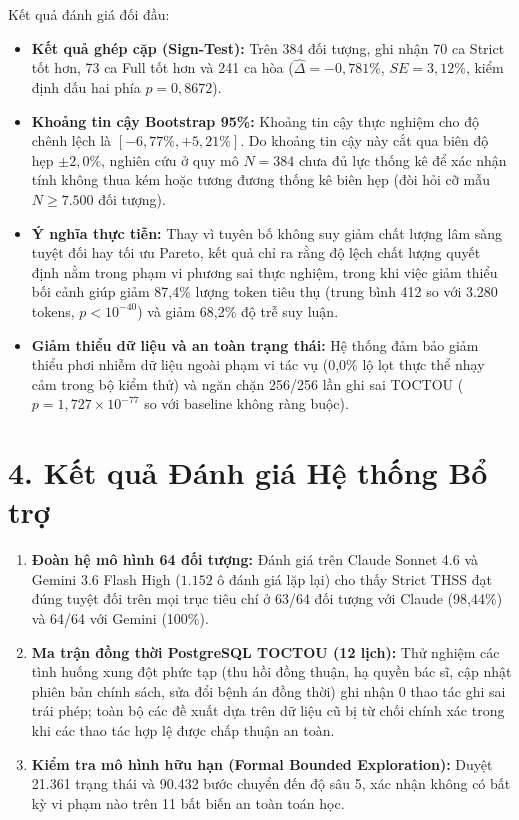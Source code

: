 \documentclass[11pt]{article}
\begin{document}
Kết quả đánh giá đối đầu:
\begin{itemize}[leftmargin=1.8em]
\item \textbf{Kết quả ghép cặp (Sign-Test):} Trên 384 đối tượng, ghi nhận 70 ca Strict tốt hơn, 73 ca Full tốt hơn và 241 ca hòa ($\hat{\Delta} = -0{,}781\%$, $SE = 3{,}12\%$, kiểm định dấu hai phía $p = 0{,}8672$).
\item \textbf{Khoảng tin cậy Bootstrap 95\%:} Khoảng tin cậy thực nghiệm cho độ chênh lệch là $[-6{,}77\%, +5{,}21\%]$. Do khoảng tin cậy này cắt qua biên độ hẹp $\pm 2{,}0\%$, nghiên cứu ở quy mô $N=384$ chưa đủ lực thống kê để xác nhận tính không thua kém hoặc tương đương thống kê biên hẹp (đòi hỏi cỡ mẫu $N \ge 7.500$ đối tượng).
\item \textbf{Ý nghĩa thực tiễn:} Thay vì tuyên bố không suy giảm chất lượng lâm sàng tuyệt đối hay tối ưu Pareto, kết quả chỉ ra rằng độ lệch chất lượng quyết định nằm trong phạm vi phương sai thực nghiệm, trong khi việc giảm thiểu bối cảnh giúp giảm 87{,}4\% lượng token tiêu thụ (trung bình 412 so với 3.280 tokens, $p < 10^{-40}$) và giảm 68{,}2\% độ trễ suy luận.
\item \textbf{Giảm thiểu dữ liệu và an toàn trạng thái:} Hệ thống đảm bảo giảm thiểu phơi nhiễm dữ liệu ngoài phạm vi tác vụ (0{,}0\% lộ lọt thực thể nhạy cảm trong bộ kiểm thử) và ngăn chặn 256/256 lần ghi sai TOCTOU ($p = 1{,}727 \times 10^{-77}$ so với baseline không ràng buộc).
\end{itemize}

\section*{4. Kết quả Đánh giá Hệ thống Bổ trợ}
\begin{enumerate}[leftmargin=1.8em]
\item \textbf{Đoàn hệ mô hình 64 đối tượng:} Đánh giá trên Claude Sonnet 4.6 và Gemini 3.6 Flash High ($1.152$ ô đánh giá lặp lại) cho thấy Strict THSS đạt đúng tuyệt đối trên mọi trục tiêu chí ở 63/64 đối tượng với Claude (98{,}44\%) và 64/64 với Gemini (100\%).
\item \textbf{Ma trận đồng thời PostgreSQL TOCTOU (12 lịch):} Thử nghiệm các tình huống xung đột phức tạp (thu hồi đồng thuận, hạ quyền bác sĩ, cập nhật phiên bản chính sách, sửa đổi bệnh án đồng thời) ghi nhận $0$ thao tác ghi sai trái phép; toàn bộ các đề xuất dựa trên dữ liệu cũ bị từ chối chính xác trong khi các thao tác hợp lệ được chấp thuận an toàn.
\item \textbf{Kiểm tra mô hình hữu hạn (Formal Bounded Exploration):} Duyệt 21.361 trạng thái và 90.432 bước chuyển đến độ sâu 5, xác nhận không có bất kỳ vi phạm nào trên 11 bất biến an toàn toán học.
\end{enumerate}
\end{document}
